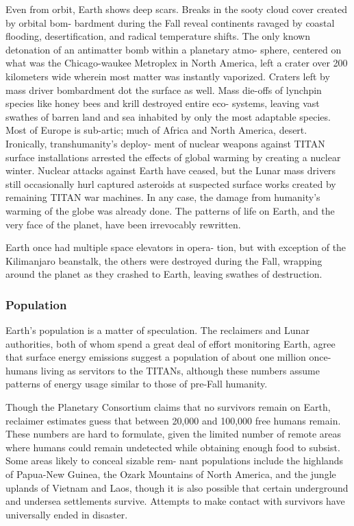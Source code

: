 Even from orbit, Earth shows deep scars. Breaks 
in the sooty cloud cover created by orbital bom-
bardment during the Fall reveal continents ravaged 
by coastal flooding, desertification, and radical 
temperature shifts. The only known detonation 
of an antimatter bomb within a planetary atmo-
sphere, centered on what was the Chicago-waukee 
Metroplex in North America, left a crater over 200 
kilometers wide wherein most matter was instantly 
vaporized. Craters left by mass driver bombardment 
dot the surface as well. Mass die-offs of lynchpin 
species like honey bees and krill destroyed entire eco-
systems, leaving vast swathes of barren land and sea 
inhabited by only the most adaptable species. Most 
of Europe is sub-artic; much of Africa and North 
America, desert. Ironically, transhumanity's deploy-
ment of nuclear weapons against TITAN surface 
installations arrested the effects of global warming 
by creating a nuclear winter. Nuclear attacks against 
Earth have ceased, but the Lunar mass drivers still 
occasionally hurl captured asteroids at suspected 
surface works created by remaining TITAN war 
machines. In any case, the damage from humanity's 
warming of the globe was already done. The patterns 
of life on Earth, and the very face of the planet, have 
been irrevocably rewritten.

Earth once had multiple space elevators in opera-
tion, but with exception of the Kilimanjaro beanstalk, 
the others were destroyed during the Fall, wrapping 
around the planet as they crashed to Earth, leaving 
swathes of destruction.

\subsubsection{Population}

Earth's population is a matter of speculation. The 
reclaimers and Lunar authorities, both of whom 
spend a great deal of effort monitoring Earth, agree 
that surface energy emissions suggest a population of 
about one million once-humans living as servitors to 
the TITANs, although these numbers assume patterns 
of energy usage similar to those of pre-Fall humanity.

Though the Planetary Consortium claims that 
no survivors remain on Earth, reclaimer estimates 
guess that between 20,000 and 100,000 free humans 
remain. These numbers are hard to formulate, given 
the limited number of remote areas where humans 
could remain undetected while obtaining enough food 
to subsist. Some areas likely to conceal sizable rem-
nant populations include the highlands of Papua-New 
Guinea, the Ozark Mountains of North America, and 
the jungle uplands of Vietnam and Laos, though it is 
also possible that certain underground and undersea 
settlements survive. Attempts to make contact with 
survivors have universally ended in disaster.

